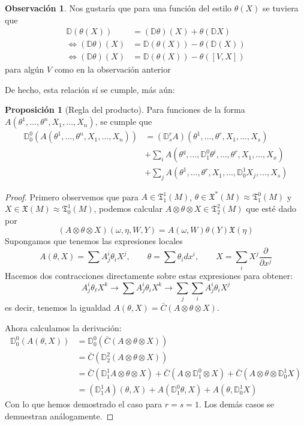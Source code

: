 \documentclass[spanish]{book}
\theoremstyle{definition}
\newtheorem*{prop}{Proposición}
\newtheorem*{obs}{Observación}
\newcommand{\D}{\mathbb{D}}
\newcommand{\X}{\mathfrak{X}}
\newcommand{\T}{\mathfrak{T}}
\begin{document}
	\begin{obs}
		Nos gustaría que para una función del estilo $\theta(X)$ se tuviera que
		\begin{align*}
			\D(\theta(X))&=(\D\theta)(X)+\theta(\D X)\\
			\iff(\D\theta)(X)&=\D(\theta(X))-\theta(\D(X))\\
			\iff(\D\theta)(X)&=\D(\theta(X))-\theta([V,X])
		\end{align*}
		para algún $V$ como en la observación anterior
	\end{obs}
	De hecho, esta relación sí se cumple, más aún:
	\begin{prop}[Regla del producto]
		Para funciones de la forma $A(\theta^1,\ldots,\theta^n,X_1,\ldots,X_n)$, se cumple que
		\begin{align*}
			\D^0_0(A(\theta^1,\ldots,\theta^n,X_1,\ldots,X_n))&=(\D^r_sA)(\theta^1,\ldots,\theta^r,X_1,\ldots,X_s)\\
			&+\sum_iA(\theta^q,\ldots,\D_1^0\theta^i,\ldots,\theta^r,X_1,\ldots,X_x)\\
			&+\sum_jA(\theta^1,\ldots,\theta^r,X_1,\ldots,\D^1_0X_j,\ldots,X_s)
		\end{align*}
	\end{prop}
	\begin{proof}
		Primero observemos que para $A\in\T^1_1(M)$, $\theta\in\X^*(M)\approx\T^0_1(M)$ y $X\in\X(M)\approx\T^1_0(M)$, podemos calcular $A\otimes\theta\otimes X\in\T^2_2(M)$ que esté dado por
		\[(A\otimes\theta\otimes X)(\omega,\eta,W,Y)=A(\omega,W)\theta(Y)\X(\eta)\]
		Supongamos que tenemos las expresiones locales \[A(\theta,X)=\sum A^i_j\theta_iX^j,\qquad\theta=\sum\theta_idx^i,\qquad X=\sum_iX^j\frac{\partial}{\partial x^j}\]
		Hacemos dos contracciones directamente sobre estas expresiones para obtener:
		\[A^i_j\theta_\ell X^k\to\sum A^i_j\theta_iX^k\to\sum_j\sum_iA^i_j\theta_iX^j\]
		es decir, tenemos la igualdad $A(\theta,X)=\bar{C}(A\otimes\theta\otimes X)$.
		
		Ahora calculamos la derivación:
		\begin{align*}
			\D^0_0(A(\theta,X))&=\D^0_0(\bar{C}(A\otimes\theta\otimes X))\\
			&=\bar{C}(\D^2_2(A\otimes\theta\otimes X))\\
			&=\bar{C}(\D^1_1A\otimes\theta\otimes X)+\bar{C}(A\otimes\D^0_1\otimes X)+\bar{C}(A\otimes\theta\otimes\D^1_0X)\\
			&=(\D^1_1A)(\theta,X)+A(\D^0_1\theta,X)+A(\theta,\D^1_0X)
		\end{align*}
		Con lo que hemos demostrado el caso para $r=s=1$. Los demás casos se demuestran análogamente.
	\end{proof}
	
\end{document}
